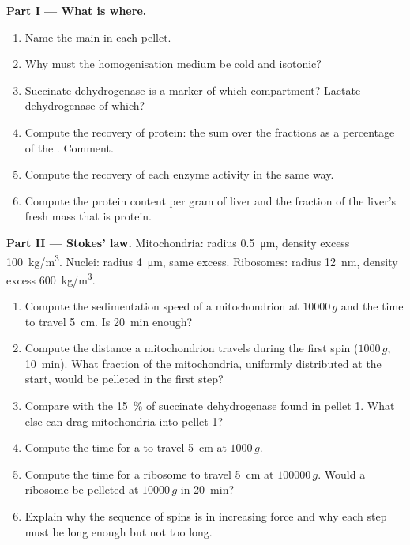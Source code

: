 \begin{problem}
\medskip
\noindent\textbf{Part I --- What is where.}
\begin{enumerate}
  \item Name the main  in each pellet.
  \item Why must the homogenisation medium be cold and isotonic?
  \item Succinate dehydrogenase is a marker of which compartment?
        Lactate dehydrogenase of which?
  \item Compute the recovery of protein: the sum over the fractions as
        a percentage of the . Comment.
  \item Compute the recovery of each enzyme activity in the same way.
  \item Compute the protein content per gram of liver and the fraction
        of the liver's fresh mass that is protein.
\end{enumerate}

\medskip
\noindent\textbf{Part II --- Stokes' law.}
Mitochondria: radius \qty{0.5}{\micro m}, density excess
\qty{100}{kg/m^3}. Nuclei: radius \qty{4}{\micro m}, same excess.
Ribosomes: radius \qty{12}{nm}, density excess \qty{600}{kg/m^3}.
\begin{enumerate}[resume]
  \item Compute the sedimentation speed of a mitochondrion at
        $\num{10000}\,g$ and the time to travel \qty{5}{cm}. Is
        \qty{20}{min} enough?
  \item Compute the distance a mitochondrion travels during the first
        spin ($1000\,g$, \qty{10}{min}). What fraction of the
        mitochondria, uniformly distributed at the start, would be
        pelleted in the first step?
  \item Compare with the \qty{15}{\%} of succinate dehydrogenase found
        in pellet 1. What else can drag mitochondria into pellet 1?
  \item Compute the time for a  to travel \qty{5}{cm} at
        $1000\,g$.
  \item Compute the time for a ribosome to travel \qty{5}{cm} at
        $\num{100000}\,g$. Would a ribosome be pelleted at
        $\num{10000}\,g$ in \qty{20}{min}?
  \item Explain why the sequence of spins is in increasing force and
        why each step must be long enough but not too long.
\end{enumerate}


\end{problem}
